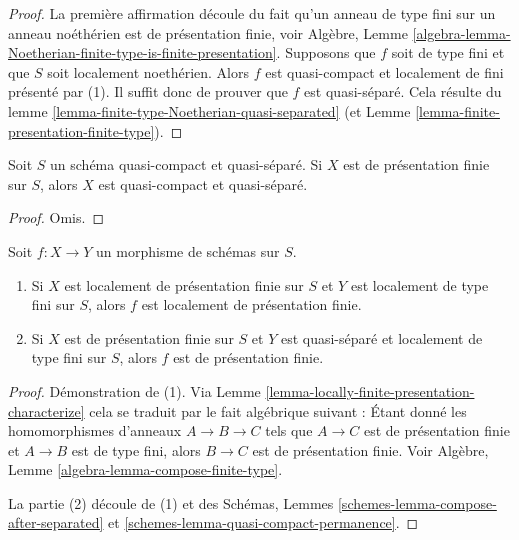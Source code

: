 \begin{proof}
La première affirmation découle du fait qu'un
anneau de type fini sur un anneau noéthérien est de présentation
finie, voir Algèbre, Lemme \ref{algebra-lemma-Noetherian-finite-type-is-finite-presentation}. Supposons que $f$
soit de type fini et que $S$ soit localement
noethérien. Alors $f$ est quasi-compact et
localement de fini présenté par (1). Il suffit
donc de prouver que $f$ est quasi-séparé. Cela résulte
du lemme \ref{lemma-finite-type-Noetherian-quasi-separated} (et Lemme \ref{lemma-finite-presentation-finite-type}).
\end{proof}

\begin{lemma}
\label{lemma-finite-presentation-quasi-compact-quasi-separated}
Soit $S$ un schéma quasi-compact et quasi-séparé. Si $X$
est de présentation finie sur $S$, alors $X$ est quasi-compact
et quasi-séparé.
\end{lemma}

\begin{proof}
Omis.
\end{proof}

\begin{lemma}
\label{lemma-finite-presentation-permanence}
Soit $f : X \to Y$ un morphisme de schémas sur $S$.
\begin{enumerate}
\item Si $X$ est localement de présentation finie sur $S$ et $Y$
est localement de type fini sur $S$, alors $f$ est localement
de présentation finie.
\item Si $X$ est de présentation finie sur $S$ et $Y$ est quasi-séparé
et localement de type fini sur $S$, alors $f$ est de présentation finie.
\end{enumerate}
\end{lemma}

\begin{proof}
Démonstration de (1). Via Lemme \ref{lemma-locally-finite-presentation-characterize} cela se traduit par le fait algébrique
suivant : Étant donné les homomorphismes
d'anneaux $A \to B \to C$ tels que $A \to C$
est de présentation finie et $A \to B$ est de
type fini, alors $B \to C$ est de présentation
finie. Voir Algèbre, Lemme \ref{algebra-lemma-compose-finite-type}.

\medskip\noindent
La partie (2)
découle de (1) et des Schémas, Lemmes
\ref{schemes-lemma-compose-after-separated} et \ref{schemes-lemma-quasi-compact-permanence}.
\end{proof}

